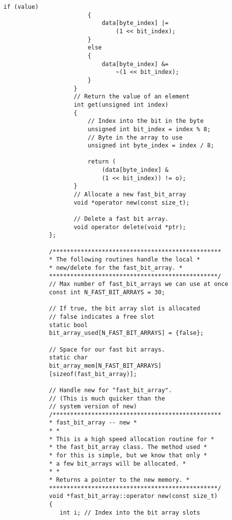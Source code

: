 \begin{LTR}
\begin{lstlisting}[style=C++Style]
             			if (value)
             			{
             				data[byte_index] |=
             					(1 << bit_index);
             			}
             			else
             			{
             				data[byte_index] &=
             					~(1 << bit_index);
             			}
             		}
             		// Return the value of an element
             		int get(unsigned int index)
             		{
             			// Index into the bit in the byte
             			unsigned int bit_index = index % 8;
             			// Byte in the array to use
             			unsigned int byte_index = index / 8;

             			return (
             				(data[byte_index] &
             				(1 << bit_index)) != o);
             		}
             		// Allocate a new fast_bit_array
             		void *operator new(const size_t);

             		// Delete a fast bit array.
             		void operator delete(void *ptr);
             };

             /************************************************
             * The following routines handle the local *
             * new/delete for the fast_bit_array. *
             ************************************************/
             // Max number of fast_bit_arrays we can use at once
             const int N_FAST_BIT_ARRAYS = 30;

             // If true, the bit array slot is allocated
             // false indicates a free slot
             static bool
             bit_array_used[N_FAST_BIT_ARRAYS] = {false};

             // Space for our fast bit arrays.
             static char
             bit_array_mem[N_FAST_BIT_ARRAYS]
             [sizeof(fast_bit_array)];

             // Handle new for "fast_bit_array".
             // (This is much quicker than the
             // system version of new)
             /************************************************
             * fast_bit_array -- new *
             * *
             * This is a high speed allocation routine for *
             * the fast_bit_array class. The method used *
             * for this is simple, but we know that only *
             * a few bit_arrays will be allocated. *
             * *
             * Returns a pointer to the new memory. *
             ************************************************/
             void *fast_bit_array::operator new(const size_t)
             {
             	int i; // Index into the bit array slots


\end{lstlisting}
\end{LTR}
